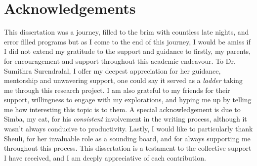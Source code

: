 \chapter*{Acknowledgements}
This dissertation was a journey, filled to the brim with countless late nights, and error filled programs but as I come to the end of this journey, I would be amiss if I did not extend my gratitude to the support and guidance to firstly, my parents, for encouragement and support throughout this academic endeavour. To Dr. Sumithra Surendralal, I offer my deepest appreciation for her guidance, mentorship and unwavering support, one could say it served as a \textit{ladder} taking me through this research project. I am also grateful to my friends for their support, willingness to engage with my explorations, and hyping me up by telling me how interesting this topic is to them. A special acknowledgement is due to Simba, my cat, for his \textit{consistent} involvement in the writing process, although it wasn't always conducive to productivity. Lastly, I would like to particularly thank Sheuli, for her invaluable role as a sounding board, and for always supporting me throughout this process. This dissertation is a testament to the collective support I have received, and I am deeply appreciative of each contribution.